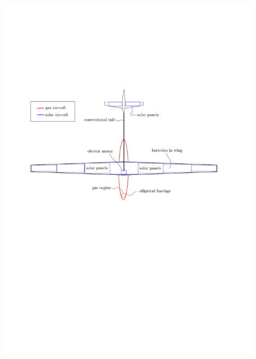 \documentclass{beamer}
\begin{document}
\begin{frame}
    \includegraphics[width=1.0\textwidth]{simpleaircraft.pdf}

\end{frame}
\end{document}
